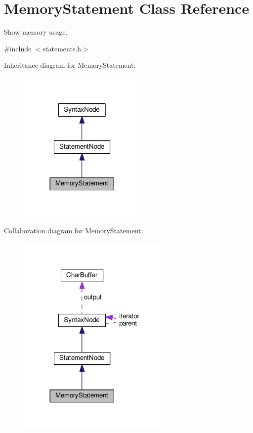\hypertarget{classMemoryStatement}{}\section{Memory\+Statement Class Reference}
\label{classMemoryStatement}


Show memory usage.  




{\ttfamily \#include $<$statements.\+h$>$}



Inheritance diagram for Memory\+Statement\+:\nopagebreak
\begin{figure}[H]
\begin{center}
\leavevmode
\includegraphics[width=177pt]{classMemoryStatement__inherit__graph}
\end{center}
\end{figure}


Collaboration diagram for Memory\+Statement\+:\nopagebreak
\begin{figure}[H]
\begin{center}
\leavevmode
\includegraphics[width=216pt]{classMemoryStatement__coll__graph}
\end{center}
\end{figure}
